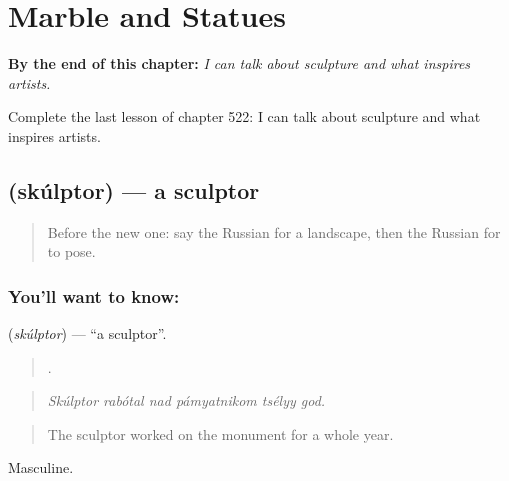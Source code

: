 
\chapter{Marble and Statues}
\label{ch:ru-marble-and-statues}

\begin{chapteropening}
\textbf{By the end of this chapter:} \emph{I can talk about sculpture and what inspires artists.}

Complete the last lesson of chapter 522: I can talk about sculpture and what inspires artists.
\end{chapteropening}

\section[\texorpdfstring{\ru{скульптор} (skúlptor)}{скульптор (skúlptor)}]{ (skúlptor) — a sculptor}

\label{lesson:RU-C522-skulptor}



\begin{quote}
Before the new one: say the Russian for a landscape, then the Russian for to pose.
\end{quote}

\subsection*{You'll want to know: }
\textbf{} (\emph{skúlptor}) — \textquotedblleft{}a sculptor\textquotedblright{}.

\begin{quote}
     .
\end{quote}

\begin{quote}
\emph{Skúlptor rabótal nad pámyatnikom tsélyy god.}
\end{quote}

\begin{quote}
The sculptor worked on the monument for a whole year.
\end{quote}

Masculine.

